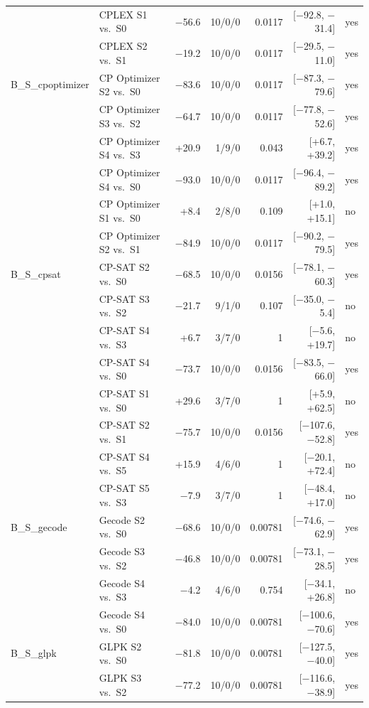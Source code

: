 \begin{longtable}{llrrrrl}
 & CPLEX S1 vs.\ S0 & $-$56.6 & 10/0/0 & 0.0117 & [$-$92.8, $-$31.4] & yes \\
 & CPLEX S2 vs.\ S1 & $-$19.2 & 10/0/0 & 0.0117 & [$-$29.5, $-$11.0] & yes \\
B\_S\_cpoptimizer & CP Optimizer S2 vs.\ S0 & $-$83.6 & 10/0/0 & 0.0117 & [$-$87.3, $-$79.6] & yes \\
 & CP Optimizer S3 vs.\ S2 & $-$64.7 & 10/0/0 & 0.0117 & [$-$77.8, $-$52.6] & yes \\
 & CP Optimizer S4 vs.\ S3 & +20.9 & 1/9/0 & 0.043 & [+6.7, +39.2] & yes \\
 & CP Optimizer S4 vs.\ S0 & $-$93.0 & 10/0/0 & 0.0117 & [$-$96.4, $-$89.2] & yes \\
 & CP Optimizer S1 vs.\ S0 & +8.4 & 2/8/0 & 0.109 & [+1.0, +15.1] & no \\
 & CP Optimizer S2 vs.\ S1 & $-$84.9 & 10/0/0 & 0.0117 & [$-$90.2, $-$79.5] & yes \\
B\_S\_cpsat & CP-SAT S2 vs.\ S0 & $-$68.5 & 10/0/0 & 0.0156 & [$-$78.1, $-$60.3] & yes \\
 & CP-SAT S3 vs.\ S2 & $-$21.7 & 9/1/0 & 0.107 & [$-$35.0, $-$5.4] & no \\
 & CP-SAT S4 vs.\ S3 & +6.7 & 3/7/0 & 1 & [$-$5.6, +19.7] & no \\
 & CP-SAT S4 vs.\ S0 & $-$73.7 & 10/0/0 & 0.0156 & [$-$83.5, $-$66.0] & yes \\
 & CP-SAT S1 vs.\ S0 & +29.6 & 3/7/0 & 1 & [+5.9, +62.5] & no \\
 & CP-SAT S2 vs.\ S1 & $-$75.7 & 10/0/0 & 0.0156 & [$-$107.6, $-$52.8] & yes \\
 & CP-SAT S4 vs.\ S5 & +15.9 & 4/6/0 & 1 & [$-$20.1, +72.4] & no \\
 & CP-SAT S5 vs.\ S3 & $-$7.9 & 3/7/0 & 1 & [$-$48.4, +17.0] & no \\
B\_S\_gecode & Gecode S2 vs.\ S0 & $-$68.6 & 10/0/0 & 0.00781 & [$-$74.6, $-$62.9] & yes \\
 & Gecode S3 vs.\ S2 & $-$46.8 & 10/0/0 & 0.00781 & [$-$73.1, $-$28.5] & yes \\
 & Gecode S4 vs.\ S3 & $-$4.2 & 4/6/0 & 0.754 & [$-$34.1, +26.8] & no \\
 & Gecode S4 vs.\ S0 & $-$84.0 & 10/0/0 & 0.00781 & [$-$100.6, $-$70.6] & yes \\
B\_S\_glpk & GLPK S2 vs.\ S0 & $-$81.8 & 10/0/0 & 0.00781 & [$-$127.5, $-$40.0] & yes \\
 & GLPK S3 vs.\ S2 & $-$77.2 & 10/0/0 & 0.00781 & [$-$116.6, $-$38.9] & yes \\

\end{longtable}
